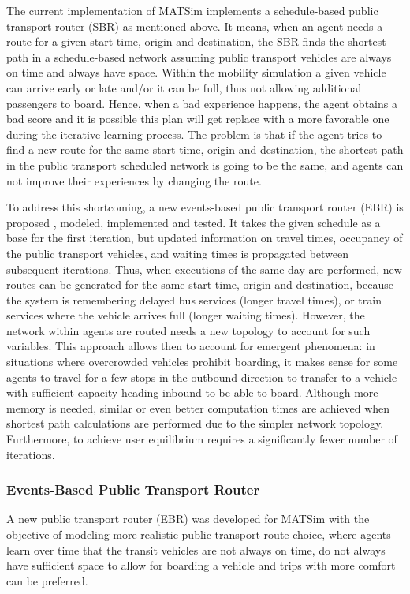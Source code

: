 The current implementation of MATSim implements a schedule-based public transport router (SBR) as mentioned above. It means, when an agent needs a route for a given start time, origin and destination, the SBR finds the shortest path in a schedule-based network assuming public transport vehicles are always on time and always have space. Within the mobility simulation a given vehicle can arrive early or late and/or it can be full, thus not allowing additional passengers to board. Hence, when a bad experience happens, the agent obtains a bad score and it is possible this plan will get replace with a more favorable one during the iterative learning process. The problem is that if the agent tries to find a new route for the same start time, origin and destination, the shortest path in the public transport scheduled network is going to be the same, and agents can not improve their experiences by changing the route.

To address this shortcoming, a new events-based public transport router (EBR) is proposed \citep[][]{OrdonezErath_TechRep_FCL_2013}, modeled, implemented and tested. It takes the given schedule as a base for the first iteration, but updated information on travel times, occupancy of the public transport vehicles, and waiting times is propagated between subsequent iterations. Thus, when executions of the same day are performed, new routes can be generated for the same start time, origin and destination, because the system is remembering delayed bus services (longer travel times), or train services where the vehicle arrives full (longer waiting times). However, the network within agents are routed needs a new topology to account for such variables. This approach allows then to account for  emergent phenomena: in situations where overcrowded vehicles prohibit boarding, it makes sense for some agents to travel for a few stops in the outbound direction to transfer to a vehicle with sufficient capacity heading inbound to be able to board. Although more memory is needed, similar or even better computation times are achieved when shortest path calculations are performed due to the simpler network topology. Furthermore, to achieve user equilibrium requires a significantly fewer number of iterations.

\subsubsection{Events-Based Public Transport Router} 
\label{sec:RouterStructure}
A new public transport router (EBR) was developed for MATSim with the objective of modeling more realistic public transport route choice, where agents learn over time that the transit vehicles are not always on time, do not always have sufficient space to allow for boarding a vehicle and trips with more comfort can be preferred.

